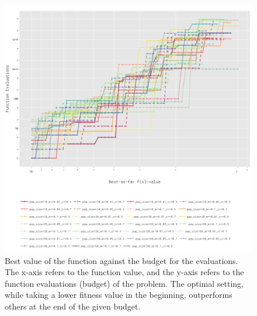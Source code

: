 \documentclass{article}
\begin{document}
\begin{figure}[h!]
    \centering
    \includegraphics[width=1\linewidth]{Graphs/Katsuura/Expected_RunTime.png}
    \caption{Best value of the function against the budget for the evaluations. The x-axis refers to the function value, and the y-axis refers to the function evaluations (budget) of the problem. The optimal setting, while taking a lower fitness value in the beginning, outperforms others at the end of the given budget. }
    \label{fig:ert-single-Katsuura}
\end{figure}
\end{document}
